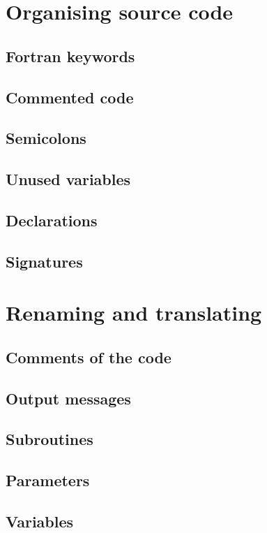 \section{Organising source code}
\subsection{Fortran keywords}
\subsection{Commented code}
\subsection{Semicolons}
\subsection{Unused variables}
\subsection{Declarations}
\subsection{Signatures}

\section{Renaming and translating}
\subsection{Comments of the code}
\subsection{Output messages}
\subsection{Subroutines}
\subsection{Parameters}
\subsection{Variables}